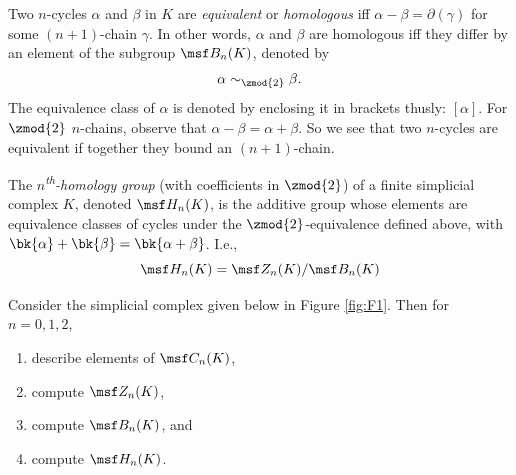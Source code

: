 \begin{definition}
  Two $n$-cycles $\alpha$ and $\beta$ in $K$ are \emph{equivalent} or
  \emph{homologous} iff $\alpha-\beta = \partial(\gamma)$ for some $(n+1)$-chain
  $\gamma$. In other words, $\alpha$ and $\beta$ are homologous iff they differ
  by an element of the subgroup $\msf B_n(K)$, denoted by
  \[
    \alpha \sim_{\zmod{2}} \beta.
  \]
  The equivalence class of $\alpha$ is denoted by enclosing it in brackets
  thusly: $[\alpha]$. For $\zmod{2}$ $n$-chains, observe that $\alpha - \beta =
  \alpha + \beta$. So we see that two $n$-cycles are equivalent if together they
  bound an $(n+1)$-chain.
\end{definition}
\begin{definition}
  The \emph{$n$\textsuperscript{th}-homology group} (with coefficients in
  $\zmod{2}$) of a finite simplicial complex $K$, denoted $\msf H_n(K)$, is the
  additive group whose elements are equivalence classes of cycles under the
  $\zmod{2}$-equivalence defined above, with $\bk{\alpha} + \bk{\beta} =
  \bk{\alpha +\beta}$. I.e.,
  \[
    \msf H_n(K) = \msf Z_n(K)/\msf B_n(K)
  \]
\end{definition}
\begin{problem}[F1]
  Consider the simplicial complex given below in Figure \cref{fig:F1}. Then for
  $n = 0, 1, 2$,
  \begin{enumerate}
  \item describe elements of $\msf C_n(K)$,
  \item compute $\msf Z_n(K)$,
  \item compute $\msf B_n(K)$, and
  \item compute $\msf H_n(K)$.
  \end{enumerate}
\end{problem}
